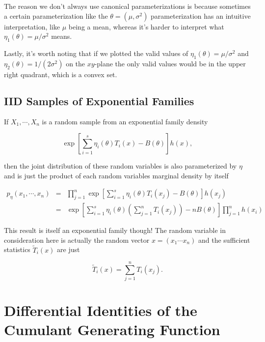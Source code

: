 \documentclass[oneside]{article}
\begin{document}
The reason we don't always use canonical parameterizations is because sometimes a certain parameterization like the $\theta = (\mu, \sigma^2)$ parameterization has an intuitive interpretation, like $\mu$ being a mean, whereas it's harder to interpret what $\eta_1(\theta) = \mu / \sigma^2$ means.

Lastly, it's worth noting that if we plotted the valid values of $\eta_1(\theta) = \mu / \sigma^2$ and $\eta_2(\theta) = 1/(2\sigma^2)$ on the $xy$-plane the only valid values would be in the upper right quadrant, which is a convex set.

\subsection{IID Samples of Exponential Families}
If $X_1, \cdots, X_n$ is a random sample from an exponential family density

\begin{equation}
\exp \left[ \sum_{i=1}^s \eta_i(\theta) T_i(x) - B(\theta) \right] h(x),
\end{equation}

then the joint distribution of these random variables is also parameterized by $\eta$ and is just the product of each random variables marginal density by itself

\begin{eqnarray}
p_\eta(x_1, \cdots, x_n) &=& \prod_{j=1}^n \exp \left[ \sum_{i=1}^s \eta_i(\theta) T_i(x_j) - B(\theta) \right] h(x_j)\nonumber\\
&=&  \exp \left[ \sum_{i=1}^s \eta_i(\theta) \left( \sum_{j=1}^n T_i(x_j) \right) - nB(\theta) \right] \prod_{j=1}^n h(x_i)
\end{eqnarray}

This result is itself an exponential family though! The random variable in consideration here is actually the random vector $x=(x_1 \cdots x_n)$ and the sufficient statistics $\widetilde{T}_i(x)$ are just

\begin{equation}
\widetilde{T}_i(x) = \sum_{j=1}^n T_i(x_j).
\end{equation}

\section{Differential Identities of the Cumulant Generating Function}
\end{document}
